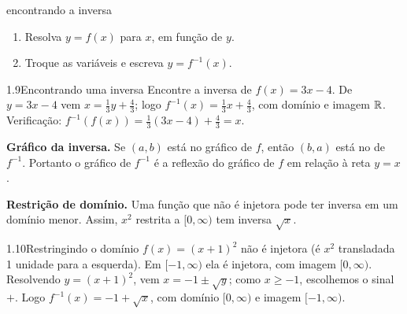 \begin{estrategia}{encontrando a inversa}
\begin{enumerate}[label=\arabic*.]
\item Resolva $y=f(x)$ para $x$, em função de $y$.
\item Troque as variáveis e escreva $y=f^{-1}(x)$.
\end{enumerate}
\end{estrategia}

\begin{exemplo}{1.9}{Encontrando uma inversa}
Encontre a inversa de $f(x)=3x-4$.
\solucao
De $y=3x-4$ vem $x=\tfrac13y+\tfrac43$; logo $f^{-1}(x)=\tfrac13x+\tfrac43$, com domínio e
imagem $\mathbb{R}$. Verificação:
$f^{-1}(f(x))=\tfrac13(3x-4)+\tfrac43=x$.
\end{exemplo}

\textbf{Gráfico da inversa.} Se $(a,b)$ está no gráfico de $f$, então $(b,a)$ está no de
$f^{-1}$. Portanto o gráfico de $f^{-1}$ é a reflexão do gráfico de $f$ em relação à reta
$y=x$.


\textbf{Restrição de domínio.} Uma função que não é injetora pode ter inversa em um domínio
menor. Assim, $x^2$ restrita a $[0,\infty)$ tem inversa $\sqrt x$.

\begin{exemplo}{1.10}{Restringindo o domínio}
$f(x)=(x+1)^2$ não é injetora (é $x^2$ transladada 1 unidade para a esquerda). Em
$[-1,\infty)$ ela é injetora, com imagem $[0,\infty)$. Resolvendo $y=(x+1)^2$, vem
$x=-1\pm\sqrt y$; como $x\ge-1$, escolhemos o sinal $+$. Logo $f^{-1}(x)=-1+\sqrt x$, com
domínio $[0,\infty)$ e imagem $[-1,\infty)$.
\end{exemplo}

